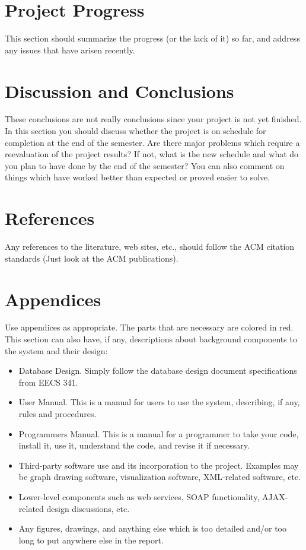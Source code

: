 \documentclass[letterpaper,12pt]{article}
\begin{document}
\newpage



\section{Project Progress}
This section should summarize the progress (or the lack of it) so far, and
address any issues that have arisen recently.

\newpage



\section{Discussion and Conclusions}
These conclusions are not really conclusions since your project is not yet
finished. In this section you should discuss whether the project is on schedule
for completion at the end of the semester. Are there major problems which
require a reevaluation of the project results?  If not, what is the new schedule
and what do you plan to have done by the end of the semester?  You can also
comment on things which have worked better than expected or proved easier to
solve.

\newpage



\section{References}
Any references to the literature, web sites, etc., should follow the ACM
citation standards (Just look at the ACM publications).

\newpage



\section{Appendices}
Use appendices as appropriate. The parts that are necessary are colored in red.
This section can also have, if any, descriptions about background components to
the system and their design:

\begin{itemize}
  \item Database Design.  Simply follow the database design document
  specifications from EECS 341.
  \item User Manual.  This is a manual for users to use the system, describing,
  if any, rules and procedures.
  \item Programmers Manual.  This is a manual for a programmer to take your
  code, install it, use it, understand the code, and revise it if necessary. 
  \item Third-party software use and its incorporation to the project.  Examples
  may be graph drawing software, visualization software, XML-related software,
  etc.
  \item Lower-level components such as web services, SOAP functionality,
  AJAX-related design discussions, etc. 
  \item Any figures, drawings, and anything else which is too detailed and/or
  too long to put anywhere else in the report. 
\end{itemize}

\newpage
\end{document}
